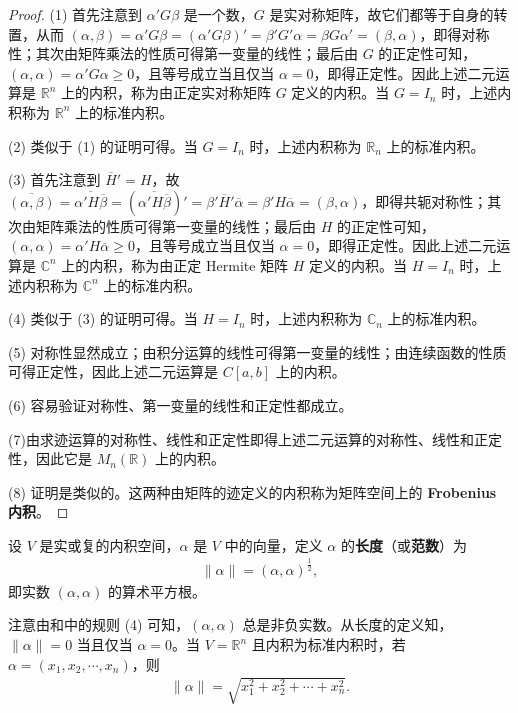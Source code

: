 \documentclass[../../main.tex]{subfiles}%
\begin{document}
\begin{proof}

(1) 首先注意到 $\alpha'G\beta$ 是一个数，$G$ 是实对称矩阵，故它们都等于自身的转置，从而 $(\alpha, \beta) = \alpha'G\beta = (\alpha'G\beta)' = \beta'G'\alpha = \beta G\alpha' = (\beta, \alpha)$，即得对称性；其次由矩阵乘法的性质可得第一变量的线性；最后由 $G$ 的正定性可知，$(\alpha, \alpha) = \alpha'G\alpha \geqslant  0$，且等号成立当且仅当 $\alpha = 0$，即得正定性。因此上述二元运算是 $\mathbb{R}^n$ 上的内积，称为由正定实对称矩阵 $G$ 定义的内积。当 $G = I_n$ 时，上述内积称为 $\mathbb{R}^n$ 上的标准内积。

(2) 类似于 (1) 的证明可得。当 $G = I_n$ 时，上述内积称为 $\mathbb{R}_n$ 上的标准内积。

(3) 首先注意到 $\overline{H}' = H$，故 $\overline{(\alpha, \beta)} = \overline{\alpha' H\overline{\beta}} = (\overline{\alpha' H\overline{\beta}})' = \beta'\overline{H}'\overline{\alpha} = \beta' H\overline{\alpha} = (\beta, \alpha)$，即得共轭对称性；其次由矩阵乘法的性质可得第一变量的线性；最后由 $H$ 的正定性可知，$(\alpha, \alpha) = \alpha' H\overline{\alpha} \geqslant  0$，且等号成立当且仅当 $\alpha = 0$，即得正定性。因此上述二元运算是 $\mathbb{C}^n$ 上的内积，称为由正定 Hermite 矩阵 $H$ 定义的内积。当 $H = I_n$ 时，上述内积称为 $\mathbb{C}^n$ 上的标准内积。

(4) 类似于 (3) 的证明可得。当 $H = I_n$ 时，上述内积称为 $\mathbb{C}_n$ 上的标准内积。

(5) 对称性显然成立；由积分运算的线性可得第一变量的线性；由连续函数的性质可得正定性，因此上述二元运算是 $C[a, b]$ 上的内积。

(6) 容易验证对称性、第一变量的线性和正定性都成立。

(7)由求迹运算的对称性、线性和正定性即得上述二元运算的对称性、线性和正定性，因此它是 $M_n(\mathbb{R})$ 上的内积。

(8) 证明是类似的。这两种由矩阵的迹定义的内积称为矩阵空间上的 \hypertarget{Frobenius 内积}{\textbf{Frobenius 内积}}。

\end{proof}

\begin{definition}[范数]\label{definition:向量的长度或范数}
设 \(V\) 是实或复的内积空间，\(\alpha\) 是 \(V\) 中的向量，定义 \(\alpha\) 的\textbf{长度}（或\textbf{范数}）为
\begin{align*}
\|\alpha\|=(\alpha,\alpha)^{\frac{1}{2}},
\end{align*}
即实数 \((\alpha,\alpha)\) 的算术平方根。
\end{definition}
\begin{remark}
注意由和中的规则 (4) 可知，\((\alpha,\alpha)\) 总是非负实数。从长度的定义知，\(\|\alpha\| = 0\) 当且仅当 \(\alpha = 0\)。当 \(V=\mathbb{R}^n\) 且内积为标准内积时，若 \(\alpha=(x_1,x_2,\cdots,x_n)\)，则
\begin{align*}
\|\alpha\|=\sqrt{x_1^2 + x_2^2+\cdots + x_n^2}.
\end{align*}
\end{remark}
\end{document}
